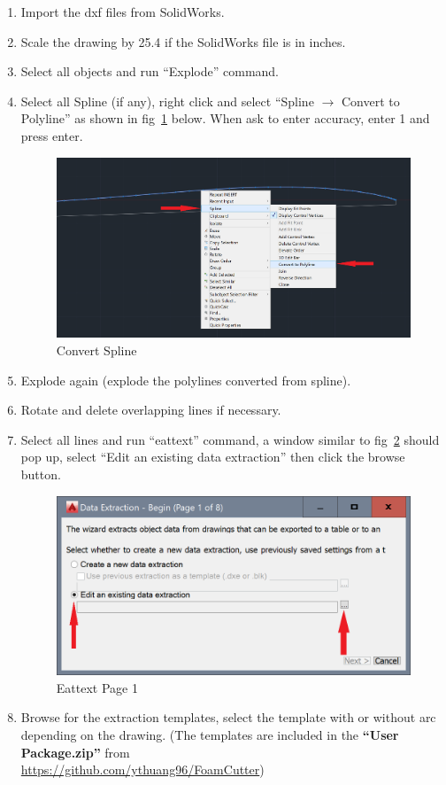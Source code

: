 \documentclass[titlepage,12pt,letter]{report}
\numberwithin{equation}{chapter}
\begin{document}
\begin{enumerate}[noitemsep,topsep=0pt]
	\item Import the dxf files from SolidWorks.
	\item Scale the drawing by 25.4 if the SolidWorks file is in inches.
	\item Select all objects and run ``Explode'' command.
	\item Select all Spline (if any), right click and select ``Spline $\rightarrow$ Convert to Polyline'' as shown in fig~\ref{fig:cad3} below. When ask to enter accuracy, enter 1 and press enter.
	\begin{figure} [H]
		\includegraphics[width = 0.9\linewidth]{./Figures/general_shape/cad3.png}
		\caption{Convert Spline}
		\label{fig:cad3}
	\end{figure}
	\item Explode again (explode the polylines converted from spline).
	\item Rotate and delete overlapping lines if necessary.
	\item Select all lines and run ``eattext'' command, a window similar to fig~\ref{fig:cad4} should pop up, select ``Edit an existing data extraction'' then click the browse button.
	\begin{figure} [H]
		\includegraphics[width = 0.6\linewidth]{./Figures/general_shape/cad4.png}
		\caption{Eattext Page 1}
		\label{fig:cad4}
	\end{figure}
	\item Browse for the extraction templates, select the template with or without arc depending on the drawing. (The templates are included in the \textbf{``User Package.zip''} from \\ \href{https://github.com/ythuang96/FoamCutter}{https://github.com/ythuang96/FoamCutter})

\end{enumerate}
\end{document}

